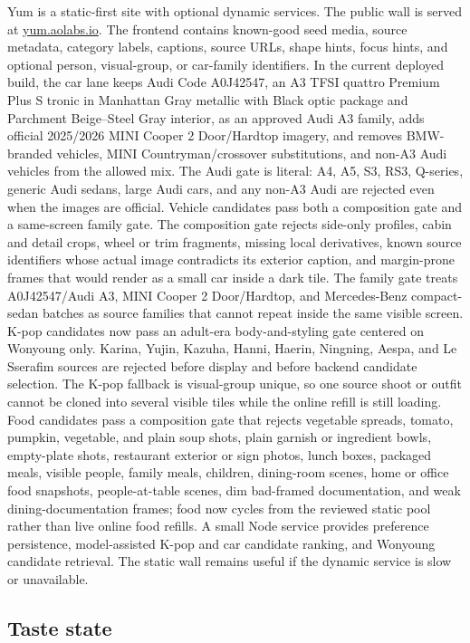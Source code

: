 \documentclass[12pt,letterpaper]{article}
\begin{document}
Yum is a static-first site with optional dynamic services. The public wall is served at \href{https://yum.aolabs.io}{yum.aolabs.io}. The frontend contains known-good seed media, source metadata, category labels, captions, source URLs, shape hints, focus hints, and optional person, visual-group, or car-family identifiers. In the current deployed build, the car lane keeps Audi Code A0J42547, an A3 TFSI quattro Premium Plus S tronic in Manhattan Gray metallic with Black optic package and Parchment Beige--Steel Gray interior, as an approved Audi A3 family, adds official 2025/2026 MINI Cooper 2 Door/Hardtop imagery, and removes BMW-branded vehicles, MINI Countryman/crossover substitutions, and non-A3 Audi vehicles from the allowed mix. The Audi gate is literal: A4, A5, S3, RS3, Q-series, generic Audi sedans, large Audi cars, and any non-A3 Audi are rejected even when the images are official. Vehicle candidates pass both a composition gate and a same-screen family gate. The composition gate rejects side-only profiles, cabin and detail crops, wheel or trim fragments, missing local derivatives, known source identifiers whose actual image contradicts its exterior caption, and margin-prone frames that would render as a small car inside a dark tile. The family gate treats A0J42547/Audi A3, MINI Cooper 2 Door/Hardtop, and Mercedes-Benz compact-sedan batches as source families that cannot repeat inside the same visible screen. K-pop candidates now pass an adult-era body-and-styling gate centered on Wonyoung only. Karina, Yujin, Kazuha, Hanni, Haerin, Ningning, Aespa, and Le Sserafim sources are rejected before display and before backend candidate selection. The K-pop fallback is visual-group unique, so one source shoot or outfit cannot be cloned into several visible tiles while the online refill is still loading. Food candidates pass a composition gate that rejects vegetable spreads, tomato, pumpkin, vegetable, and plain soup shots, plain garnish or ingredient bowls, empty-plate shots, restaurant exterior or sign photos, lunch boxes, packaged meals, visible people, family meals, children, dining-room scenes, home or office food snapshots, people-at-table scenes, dim bad-framed documentation, and weak dining-documentation frames; food now cycles from the reviewed static pool rather than live online food refills. A small Node service provides preference persistence, model-assisted K-pop and car candidate ranking, and Wonyoung candidate retrieval. The static wall remains useful if the dynamic service is slow or unavailable.

\subsection{Taste state}
\end{document}
